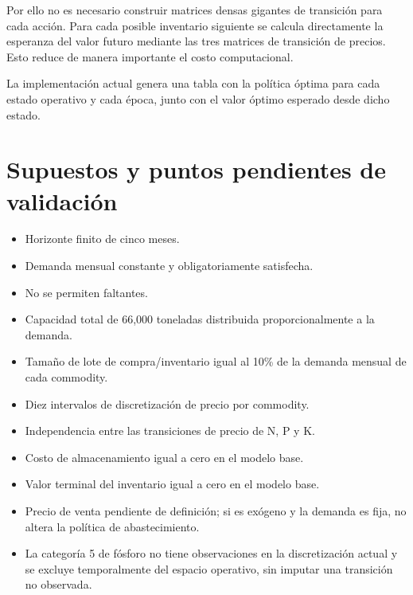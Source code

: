 \documentclass[11pt]{article}
\begin{document}
Por ello no es necesario construir matrices densas gigantes de transición para cada acción. Para cada posible inventario siguiente se calcula directamente la esperanza del valor futuro mediante las tres matrices de transición de precios. Esto reduce de manera importante el costo computacional.

La implementación actual genera una tabla con la política óptima para cada estado operativo y cada época, junto con el valor óptimo esperado desde dicho estado.

\section{Supuestos y puntos pendientes de validación}

\begin{itemize}
    \item Horizonte finito de cinco meses.
    \item Demanda mensual constante y obligatoriamente satisfecha.
    \item No se permiten faltantes.
    \item Capacidad total de 66,000 toneladas distribuida proporcionalmente a la demanda.
    \item Tamaño de lote de compra/inventario igual al 10\% de la demanda mensual de cada commodity.
    \item Diez intervalos de discretización de precio por commodity.
    \item Independencia entre las transiciones de precio de N, P y K.
    \item Costo de almacenamiento igual a cero en el modelo base.
    \item Valor terminal del inventario igual a cero en el modelo base.
    \item Precio de venta pendiente de definición; si es exógeno y la demanda es fija, no altera la política de abastecimiento.
    \item La categoría 5 de fósforo no tiene observaciones en la discretización actual y se excluye temporalmente del espacio operativo, sin imputar una transición no observada.
\end{itemize}
\end{document}

